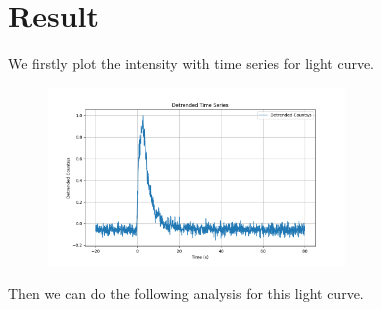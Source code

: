 \documentclass[nofootinbib,aps]{revtex4}
\begin{document}
\section{Result}

We firstly plot the intensity with time series for light curve.

\begin{figure}[htbp]
    \centering
    \includegraphics[width=0.7\textwidth]{detrended_time_series.png}
\end{figure}

Then we can do the following analysis for this light curve.
\end{document}
